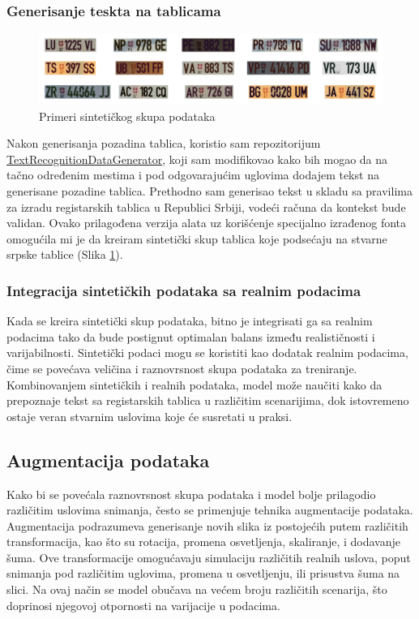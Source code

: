 \documentclass[a4paper,12pt]{article}
\begin{document}
	\subsubsection{Generisanje teskta na tablicama}
	\begin{figure}[H]
		\centering
		\includegraphics[width=\textwidth]{assets/synthetic-license-plates.png}
		\caption{Primeri sintetičkog skupa podataka}
		\label{fig:synthetic-license-plates}
	\end{figure}
	Nakon generisanja pozadina tablica, koristio sam repozitorijum \href{https://github.com/Belval/TextRecognitionDataGenerator}{TextRecognitionDataGenerator}, koji sam modifikovao kako bih mogao da na tačno određenim mestima i pod odgovarajućim uglovima dodajem tekst na generisane pozadine tablica. Prethodno sam generisao tekst u skladu sa pravilima za izradu registarskih tablica u Republici Srbiji, vodeći računa da kontekst bude validan. Ovako prilagođena verzija alata uz korišćenje specijalno izrađenog fonta omogućila mi je da kreiram sintetički skup tablica koje podsećaju na stvarne srpske tablice (Slika \ref{fig:synthetic-license-plates}).
	
	\subsubsection{Integracija sintetičkih podataka sa realnim podacima}
	Kada se kreira sintetički skup podataka, bitno je integrisati ga sa realnim podacima tako da bude postignut optimalan balans između realističnosti i varijabilnosti. Sintetički podaci mogu se koristiti kao dodatak realnim podacima, čime se povećava veličina i raznovrsnost skupa podataka za treniranje. Kombinovanjem sintetičkih i realnih podataka, model može naučiti kako da prepoznaje tekst sa registarskih tablica u različitim scenarijima, dok istovremeno ostaje veran stvarnim uslovima koje će susretati u praksi.
	
	\subsection{Augmentacija podataka}
	Kako bi se povećala raznovrsnost skupa podataka i model bolje prilagodio različitim uslovima snimanja, često se primenjuje tehnika augmentacije podataka. Augmentacija podrazumeva generisanje novih slika iz postojećih putem različitih transformacija, kao što su rotacija, promena osvetljenja, skaliranje, i dodavanje šuma. Ove transformacije omogućavaju simulaciju različitih realnih uslova, poput snimanja pod različitim uglovima, promena u osvetljenju, ili prisustva šuma na slici. Na ovaj način se model obučava na većem broju različitih scenarija, što doprinosi njegovoj otpornosti na varijacije u podacima.
	\newpage
	
\end{document}
